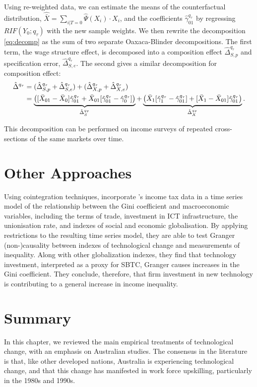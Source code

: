 Using re-weighted data, we can estimate the means of the counterfactual distribution, $\hat{\bar{X}}=\sum_{i|T=0}\hat{\Psi}(X_i) \cdot X_i$, and the coefficients $\hat{\gamma}_{01}^{q_\tau}$ by regressing $RIF(Y_0;q_\tau)$ with the new sample weights. We then rewrite the decomposition \eqref{eq:decomp} as the sum of two separate Oaxaca-Blinder decompositions. The first term, the wage structure effect, is decomposed into a composition effect $\hat{\Delta}^{q_\tau}_{S,p}$ and specification error, $\hat{\Delta}^{q_\tau}_{S,e}$. The second gives a similar decomposition for composition effect:
\begin{align}
  \hat{\Delta}^{q_\tau} &= (\hat{\Delta}^{q_\tau}_{S,p} + \hat{\Delta}^{q_\tau}_{S,e}) + (\hat{\Delta}^{q_\tau}_{X,p} + \hat{\Delta}^{q_\tau}_{X,e}) \notag \\
  &= \underbrace{\left( [\bar{X}_{01} - \bar{X}_0 ] \hat{\gamma}^{q_\tau}_{01} +
    \bar{X}_{01}[\hat{\gamma}_{01}^{q_\tau} - \hat{\gamma}_0^{q_\tau}] \right)}_{\hat{\Delta}^{q_\tau}_{S}} +
  \underbrace{\left( \bar{X}_{1}[\hat{\gamma}_{1}^{q_\tau} - \hat{\gamma}_{01}^{q_\tau}] + 
    [\bar{X}_{1} - \bar{X}_{01} ] \hat{\gamma}^{q_\tau}_{01}\right)}_{\hat{\Delta}^{q_\tau}_{X}}.
\end{align}

This decomposition can be performed on income surveys of repeated cross-sections of the same markets over time.

\section{Other Approaches}

Using cointegration techniques, \citet{Gaston2009} incorporate \citet{Leigh2005}'s income tax data in a time series model of the relationship between the Gini coefficient and macroeconomic variables, including the terms of trade, investment in ICT infrastructure, the unionisation rate, and indexes of social and economic globalisation. By applying restrictions to the resulting time series model, they are able to test Granger (non-)causality between indexes of technological change and measurements of inequality. Along with other globalization indexes, they find that technology investment, interpreted as a proxy for SBTC, Granger causes increases in the Gini coefficient. They conclude, therefore, that firm investment in new technology is contributing to a general increase in income inequality.

\section{Summary}

In this chapter, we reviewed the main empirical treatments of technological change, with an emphasis on Australian studies. The consensus in the literature is that, like other developed nations, Australia is experiencing technological change, and that this change has manifested in work force upskilling, particularly in the 1980s and 1990s.



